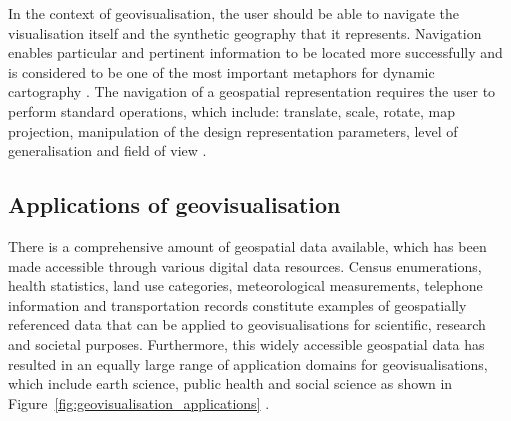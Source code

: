 \documentclass[
	fontsize=11pt
	headlines=2,
	footlines=2,
	parskip=half
]{scrartcl}
\begin{document}
{{			In the context of geovisualisation, the user should be able to navigate the visualisation itself and the synthetic geography that it represents. Navigation enables particular and pertinent information to be located more successfully and is considered to be one of the most important metaphors for dynamic cartography \parencite{cartwright2001geospatial}. The navigation of a geospatial representation requires the user to perform standard operations, which include: translate, scale, rotate, map projection, manipulation of the design representation parameters, level of generalisation and field of view \parencite{cartwright2001geospatial, hand1997survey}.

		}

		\subsection{Applications of geovisualisation} {


			There is a comprehensive amount of geospatial data available, which has been made accessible through various digital data resources. Census enumerations, health statistics, land use categories, meteorological measurements, telephone information and transportation records constitute examples of geospatially referenced data that can be applied to geovisualisations for scientific, research and societal purposes. Furthermore, this widely accessible geospatial data has resulted in an equally large range of application domains for geovisualisations, which include earth science, public health and social science as shown in Figure~\ref{fig:geovisualisation_applications} \parencite{maceachren2004geovisualization}.

}}
\end{document}
